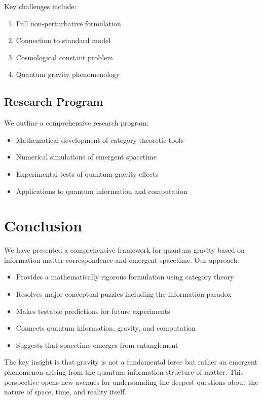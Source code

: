 \documentclass[12pt,a4paper]{article}
\begin{document}
Key challenges include:
\begin{enumerate}
\item Full non-perturbative formulation
\item Connection to standard model
\item Cosmological constant problem
\item Quantum gravity phenomenology
\end{enumerate}

\subsection{Research Program}

We outline a comprehensive research program:
\begin{itemize}
\item Mathematical development of category-theoretic tools
\item Numerical simulations of emergent spacetime
\item Experimental tests of quantum gravity effects
\item Applications to quantum information and computation
\end{itemize}

\section{Conclusion}

We have presented a comprehensive framework for quantum gravity based on information-matter correspondence and emergent spacetime. Our approach:

\begin{itemize}
\item Provides a mathematically rigorous formulation using category theory
\item Resolves major conceptual puzzles including the information paradox
\item Makes testable predictions for future experiments
\item Connects quantum information, gravity, and computation
\item Suggests that spacetime emerges from entanglement
\end{itemize}

The key insight is that gravity is not a fundamental force but rather an emergent phenomenon arising from the quantum information structure of matter. This perspective opens new avenues for understanding the deepest questions about the nature of space, time, and reality itself.
\end{document}

